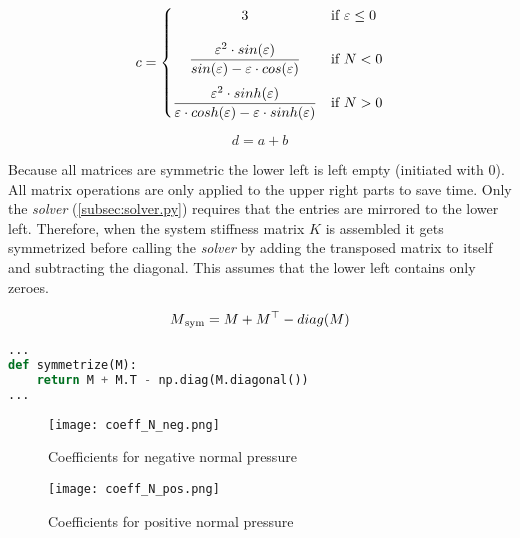 \begin{equation} \label{c}
    c = \begin{cases}
            \hfil 3              & \text{if } \varepsilon \leq 0\\[1.2em]
            \hfil \dfrac{\varepsilon^2 \cdot sin(\varepsilon)}{sin(\varepsilon) - \varepsilon \cdot cos(\varepsilon)}               & \text{if } N < 0          \\[1.2em]
            \dfrac{\varepsilon^2 \cdot sinh(\varepsilon)}{\varepsilon \cdot cosh(\varepsilon) - \varepsilon \cdot sinh(\varepsilon)}               & \text{if } N > 0
        \end{cases}
\end{equation}

\begin{equation} \label{d}
    d = a + b
\end{equation}

Because all matrices are symmetric the lower left is left empty (initiated with $0$). All matrix operations are only applied to the upper right parts to save time.
Only the \textit{solver} (\cref{subsec:solver.py}) requires that the entries are mirrored to the lower left. Therefore, when the system stiffness matrix $K$ is assembled it gets symmetrized before calling the \textit{solver} by adding the transposed matrix to itself and subtracting the diagonal.
This assumes that the lower left contains only zeroes.

\begin{equation} \label{symmetrize}
    M\textsubscript{sym} = M + M^\top - diag(M)
\end{equation}


\begin{inconsolata}
\begin{minipage}{\linewidth}
\begin{lstlisting}[language=python]
...
def symmetrize(M):
    return M + M.T - np.diag(M.diagonal())
...
\end{lstlisting}
\end{minipage}
\end{inconsolata}

\begin{figure}[h!]%
    \centering
    \texttt{[image: coeff\_N\_neg.png]}%
    \caption{Coefficients for negative normal pressure}%
    \label{fig:coeff_N_neg}%
\end{figure}

\begin{figure}[h!]%
    \centering
    \texttt{[image: coeff\_N\_pos.png]}%
    \caption{Coefficients for positive normal pressure}%
    \label{fig:coeff_N_pos}%
\end{figure}

